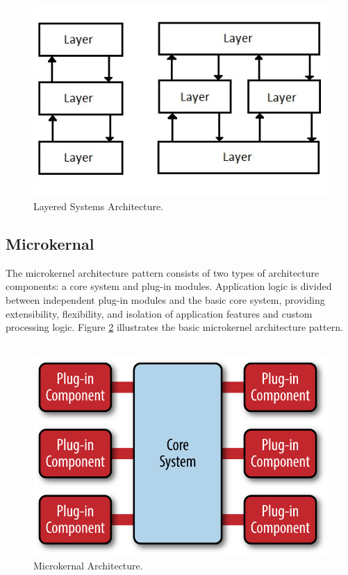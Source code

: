 \documentclass{article}
\begin{document}
\begin{figure}[h]
\centering
\includegraphics[scale=0.65]{ls.jpg}
\caption{Layered Systems Architecture.}
\label{fig_ls}
\end{figure}



\subsection{Microkernal}
The microkernel architecture pattern consists of two types of architecture components: a core system and plug-in modules. Application logic is divided between independent plug-in modules and the basic core system, providing extensibility, flexibility, and isolation of application features and custom processing logic. Figure \ref{fig_mk} illustrates the basic microkernel architecture pattern.\\\\

\begin{figure}[h]
\centering
\includegraphics[scale=1.7]{mk.png}
\caption{Microkernal Architecture.}
\label{fig_mk}
\end{figure}
\end{document}
